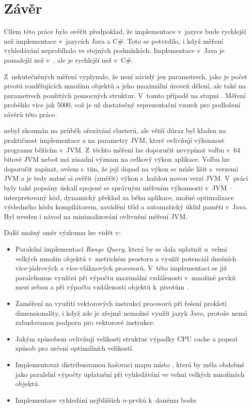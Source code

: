 \chapter{Závěr}

Cílem této práce bylo ověřit předpoklad, že implementace  v~jazyce \CC{} bude rychlejší než implementace v~jazycích Java a C\#.
Toto se potvrdilo, i když měření vyhledávání neprobíhalo ve stejných podmínkách.
Implementace v~Java je pomalejší než v~\CC, ale je rychlejší než v~C\#.

Z~uskutečněných měření vyplynulo, že \MIndex{} není závislý jen parametrech, jako je počet pivotů rozdělujících množinu objektů a jeho maximální úroveň dělení, ale také na parametrech použitých pomocných struktur.
V~tomto případě na stupni \BPTree.
Měření proběhlo více jak 5000, což je už dostatečný reprezentační vzorek pro podložení závěrů této práce.

\MIndex{} nebyl zkoumán na průběh ořezávání clusterů, ale větší důraz byl kladen na praktičnost implementace a na parametry JVM, které ovlivňují výkonnost programu běžícím v~JVM.
Z~těchto měření lze doporučit nevypínat volbu  v~64 bitové JVM neboť má zásadní význam na celkový výkon aplikace.
Volbu  lze doporučit zapínat, ovšem s~tím, že její dopad na výkon se může lišit s~verzemi JVM a je tedy nutné si ověřit (změřit) výkon s~každou novou verzí JVM.
V~práci byly také popsány úskalí spojené se správným měřením výkonnosti v~JVM -- interpretovaný kód, dynamický překlad \bytecode{} za běhu aplikace, možné optimalizace výsledného kódu kompilátorem, zavádění tříd a automatický úklid paměti v~Java.
Byl uveden i návod na minimalizování ovlivnění měření  JVM.

Další možný směr výzkumu  lze vidět v:
\begin{itemize}
\item Paralelní implementaci \emph{Range Query}, která by se dala uplatnit u~velmi velkých množin objektů v~metrickém prostoru a využít potenciál dnešních více-jádrových a více-vláknových procesorů. V~této implementaci se již paralelismus využívá při výpočtu maximální vzdálenosti v~množině prvků mezi sebou a při výpočtu vzdáleností objektů k~pivotům .
\item Zaměření na využití vektorových instrukcí procesorů při řešení prokletí dimensionality, i když zde je zřejmě nemožné využít jazyk Java, protože nemá zabudovanou podporu pro vektorové instrukce.
\item Jakým způsobem ovlivňují velikosti struktur výpadky CPU cache a popsat způsob pro určení optimálních velikostí.
\item Implementovat distribuovanou hašovací mapu místo \BPTree{}, která by měla obdobně jako paralelní výpočty uplatnění při vyhledávání ve velmi velkých množinách objektů.
\item Implementace vyhledání nejbližších $n$-prvků k~danému bodu
 \end{itemize}
 
